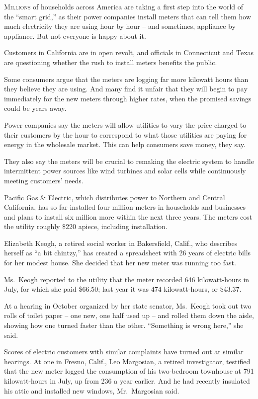 ﻿\documentclass[12pt]{article}
\begin{document}
\lettrine{M}{illions} of households across America are taking a first step
into the world of the ``smart grid,'' as their power companies install meters that can tell them how
much electricity they are using hour by hour -- and sometimes, appliance by appliance. But not
everyone is happy about it.

Customers in California are in open revolt, and officials in Connecticut and Texas are questioning
whether the rush to install meters benefits the public.

Some consumers argue that the meters are logging far more kilowatt hours than they believe they are
using. And many find it unfair that they will begin to pay immediately for the new meters through
higher rates, when the promised savings could be years away.

Power companies say the meters will allow utilities to vary the price charged to their customers by
the hour to correspond to what those utilities are paying for energy in the wholesale market. This
can help consumers save money, they say.

They also say the meters will be crucial to remaking the electric system to handle intermittent
power sources like wind turbines and solar cells while continuously meeting customers' needs.

Pacific Gas \& Electric, which distributes power to Northern and Central California, has so far
installed four million meters in households and businesses and plans to install six million more
within the next three years. The meters cost the utility roughly \$220 apiece, including
installation.

Elizabeth Keogh, a retired social worker in Bakersfield, Calif., who describes herself as ``a bit
chintzy,'' has created a spreadsheet with 26 years of electric bills for her modest house. She
decided that her new meter was running too fast.

Ms.~Keogh reported to the utility that the meter recorded 646 kilowatt-hours in July, for which she
paid \$66.50; last year it was 474 kilowatt-hours, or \$43.37.

At a hearing in October organized by her state senator, Ms.~Keogh took out two rolls of toilet paper
-- one new, one half used up -- and rolled them down the aisle, showing how one turned faster than
the other. ``Something is wrong here,'' she said.

Scores of electric customers with similar complaints have turned out at similar hearings. At one in
Fresno, Calif., Leo Margosian, a retired investigator, testified that the new meter logged the
consumption of his two-bedroom townhouse at 791 kilowatt-hours in July, up from 236 a year earlier.
And he had recently insulated his attic and installed new windows, Mr.~Margosian said.
\end{document}
